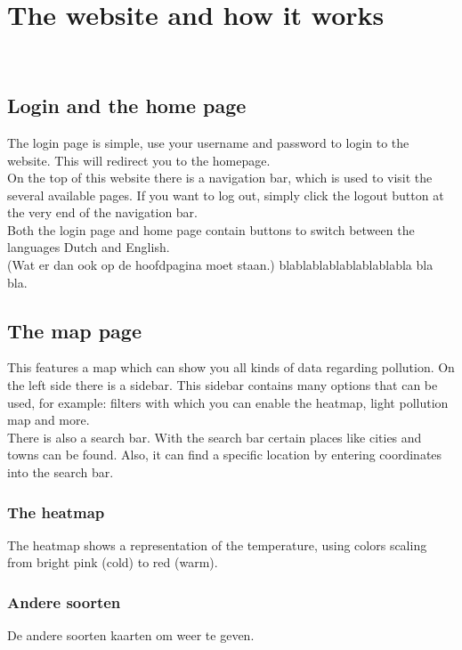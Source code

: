 \documentclass[a4paper]{article}
\begin{document}
\pagebreak

\section{The website and how it works}
~\\

\subsection{Login and the home page}
The login page is simple, use your username and password to login to the website. This will redirect you to the homepage.
\\
\indent
On the top of this website there is a navigation bar, which is used to visit the several available pages.
If you want to log out, simply click the logout button at the very end of the navigation bar.
\\
\indent
Both the login page and home page contain buttons to switch between the languages Dutch and English.
\\
\indent
(Wat er dan ook op de hoofdpagina moet staan.) blablablablablablablabla bla bla.
~\\

\subsection{The map page}
This features a map which can show you all kinds of data regarding pollution. On the left side there is a sidebar. This sidebar contains many options that can be used, for example: filters with which you can enable the heatmap, light pollution map and more.
\\
\indent
There is also a search bar. With the search bar certain places like cities and towns can be found. Also, it can find a specific location by entering coordinates into the search bar.
~\\

\subsubsection{The heatmap}
The heatmap shows a representation of the temperature, using colors scaling from bright pink (cold) to red (warm).
~\\

\subsubsection{Andere soorten}
De andere soorten kaarten om weer te geven.
\end{document}
